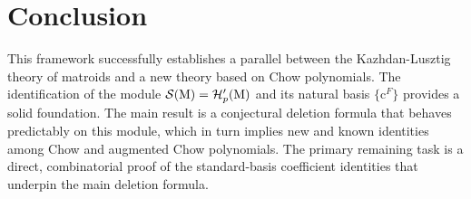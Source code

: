 \documentclass[11pt]{article}
\newcommand{\calH}{\mathcal{H}}
\newcommand{\calS}{\mathcal{S}}
\newcommand{\M}{\normalfont\text{M}}
\newcommand{\Cbasis}[1]{\mathrm{c}^{#1}}
\theoremstyle{remark}
\begin{document}
\section{Conclusion}
This framework successfully establishes a parallel between the Kazhdan-Lusztig theory of matroids and a new theory based on Chow polynomials. The identification of the module \(\calS(\M) = \calH'_p(\M)\) and its natural basis \(\{\Cbasis{F}\}\) provides a solid foundation. The main result is a conjectural deletion formula that behaves predictably on this module, which in turn implies new and known identities among Chow and augmented Chow polynomials. The primary remaining task is a direct, combinatorial proof of the standard-basis coefficient identities that underpin the main deletion formula.

\printbibliography
\end{document}
